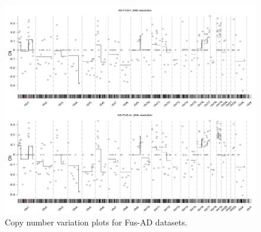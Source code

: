 \begin{figure}[!ht] 
    \centerline{\includegraphics[width = 13cm]{Figures/CNV/cnv7.jpg}}
\caption{Copy number variation plots for Fus-AD datasets.}
\label{fig:cnv-fus}
\end{figure}
